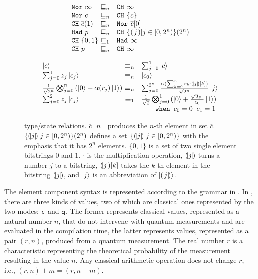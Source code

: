 \begin{figure}
{\small
{\hspace*{-6em}
\begin{minipage}[t]{0.4\textwidth}
\begin{center}
 \[
  \begin{array}{l@{~}cl}
  \tnor{\infty} &\sqsubseteq_n& \tch{\infty}\\
  \tnor{c} &\sqsubseteq_n& \tch{\{c\}}\\
  \tch{\overline{c}(1)} &\sqsubseteq_n& \tnor{\overline{c}[0]}\\
  \thad{p} &\sqsubseteq_n& \tch{\{\tos{j}|j\in[0,2^n)\}(2^n)}\\
  \tch{\{0,1\}} &\sqsubseteq_1& \thad{\infty}\\
  \tch{p} &\sqsubseteq_n& \tch{\infty}
    \end{array}
  \]
\end{center}
  \label{fig:qafny-subtype}
\end{minipage}
\qquad
\begin{minipage}[t]{0.45\textwidth}
\begin{center}
   \[
   \begin{array}{l@{~}cl}
  \ket{c} &\equiv_n& \sch{1}{ }{c}\\
  \sch{1}{z_j}{c_j} &\equiv_n& \ket{c_0}\\
  \shad{2^n}{n}{\alpha(r_j)} &\equiv_n& \sch{2^n}{\frac{\alpha(\sum_{k=0}^{n} r_k \cdot \tos{j}[k])}{\sqrt{2^n}}}{j}\\
  \sch{2}{z_j}{c_j} &\equiv_1& \shad{2}{1}{\frac{\sqrt{2}z_1}{z_0}}\\
   &&\qquad\texttt{when }c_0=0\;\;c_1=1
    \end{array}
 \]
\end{center}
  \label{fig:qafny-sequiv}
\end{minipage}
  \caption{\qafny type/state relations. $\overline{c}[n]$ produces the $n$-th element in set $\overline{c}$. $\{(\!| j |\!)|j\in[0,2^n)\}(2^n)$ defines a set $\{(\!| j |\!)|j\in[0,2^n)\}$ with the emphasis that it has $2^n$ elements. $\{0,1\}$ is a set of two single element bitstrings $0$ and $1$. $\cdot$ is the multiplication operation, $(\!| j |\!)$ turns a number $j$ to a bitstring, $(\!| j |\!)[k]$ takes the $k$-th element in the bitstring $(\!| j |\!)$, and $\left\vert{j}\right\rangle$ is an abbreviation of $\left\vert{(\!| j |\!)}\right\rangle$.}
  \label{fig:qafny-eq}
}
}
\end{figure}

The \qafny element component syntax is represented according to the grammar in . 
In \qafny, there are three kinds of values, two of which are classical ones represented by the two modes: $\texttt{c}$ and $\texttt{q}$.
The former represents classical values, represented as a natural number $n$, that do not intervene with quantum measurements and are evaluated in the compilation time, the latter represents values, represented as a pair $(r,n)$, produced from a quantum measurement. The real number $r$ is a characteristic representing the theoretical probability of the measurement resulting in the value $n$.
Any classical arithmetic operation does not change $r$, i.e., $(r,n)+m=(r,n+m)$. 

